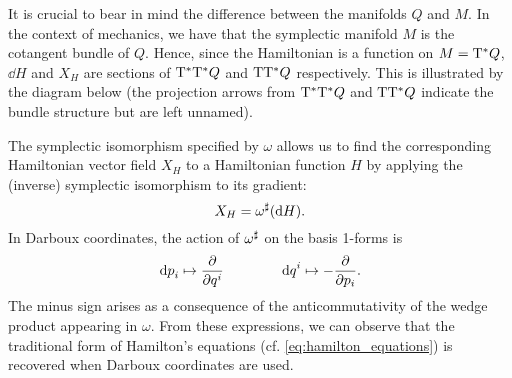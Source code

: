 It is crucial to bear in mind the difference between the manifolds \(Q\) and \(M\). In the context of mechanics, we have that the symplectic manifold \(M\) is the cotangent bundle of \(Q\). Hence, since the Hamiltonian is a function on \(M = \mathrm{T}^*Q\), \(\dd{H}\) and \(X_H\) are sections of \(\mathrm{T}^*\mathrm{T}^*Q\) and \(\mathrm{T}\mathrm{T}^*Q\) respectively. This is illustrated by the diagram below (the projection arrows from \(\mathrm{T}^*\mathrm{T}^*Q\) and \(\mathrm{T}\mathrm{T}^*Q\) indicate the bundle structure but are left unnamed).
\begin{center}
\end{center}
The symplectic isomorphism specified by \(\omega\) allows us to find the corresponding Hamiltonian vector field \(X_H\) to a Hamiltonian function \(H\) by applying the (inverse) symplectic isomorphism to its gradient:
\begin{equation} 
    X_H = \omega^\sharp(\dd{H}). 
    \label{eq:symplectic_hamiltonian_vf}
\end{equation}
In Darboux coordinates, the action of \( \omega^\sharp\) on the basis 1-forms is
\begin{equation}
     \dd{p}_i \mapsto \pdv{}{q^i} \qquad\qquad \dd{q}^i \mapsto -\pdv{}{p_i}.
\end{equation} 
The minus sign arises as a consequence of the anticommutativity of the wedge product appearing in \(\omega\). From these expressions, we can observe that the traditional form of Hamilton's equations (cf. \cref{eq:hamilton_equations}) is recovered when Darboux coordinates are used.


